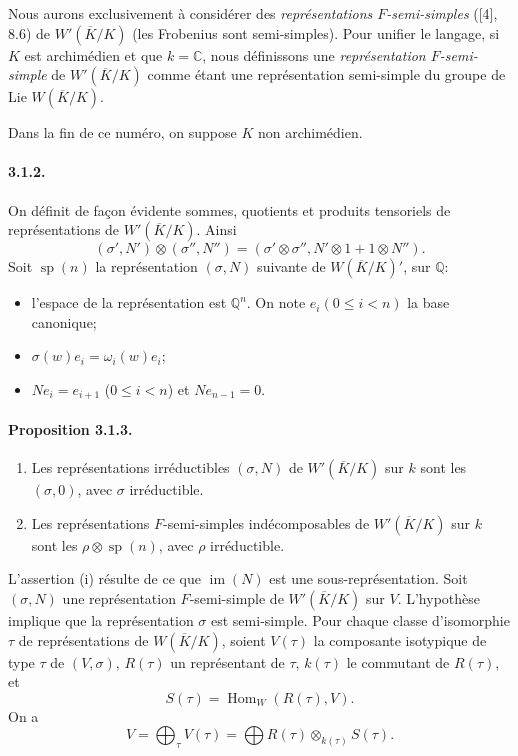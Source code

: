 \documentclass[10pt,a4paper]{article}
\providecommand{\Hom}{\operatorname{Hom}}
\providecommand{\im}{\operatorname{im}}
\providecommand{\sprep}{\operatorname{sp}}
\providecommand{\Q}{\mathbb Q}
\providecommand{\C}{\mathbb C}
\begin{document}
\clearpage
{}
\hypertarget{authority-39}{}
Nous aurons exclusivement à considérer des \emph{représentations \(F\)-semi-simples} ([4], 8.6) de \(W'(\overline K/K)\) (les Frobenius sont semi-simples). Pour unifier le langage, si \(K\) est archimédien et que \(k=\C\), nous définissons une \emph{représentation \(F\)-semi-simple} de \(W'(\overline K/K)\) comme étant une représentation semi-simple du groupe de Lie \(W(\overline K/K)\).

Dans la fin de ce numéro, on suppose \(K\) non archimédien.

\paragraph{3.1.2.} On définit de façon évidente sommes, quotients et produits tensoriels de représentations de \(W'(\overline K/K)\). Ainsi
\[
(\sigma',N')\otimes(\sigma'',N'')=(\sigma'\otimes\sigma'',N'\otimes1+1\otimes N'').
\]
Soit \(\sprep(n)\) la représentation \((\sigma,N)\) suivante de \(W(\overline K/K)'\), sur \(\Q\):
\begin{itemize}
\item l'espace de la représentation est \(\Q^n\). On note \(e_i(0\le i<n)\) la base canonique;
\item \(\sigma(w)e_i=\omega_i(w)e_i\);
\item \(Ne_i=e_{i+1}\) (\(0\le i<n\)) et \(Ne_{n-1}=0\).
\end{itemize}

\paragraph{Proposition 3.1.3.}{\itshape 
\begin{enumerate}[label=(\roman*)]
\item Les représentations irréductibles \((\sigma,N)\) de \(W'(\overline K/K)\) sur \(k\) sont les \((\sigma,0)\), avec \(\sigma\) irréductible.
\item Les représentations \(F\)-semi-simples indécomposables de \(W'(\overline K/K)\) sur \(k\) sont les \(\rho\otimes\sprep(n)\), avec \(\rho\) irréductible.
\end{enumerate}\par}

L'assertion (i) résulte de ce que \(\im(N)\) est une sous-représentation. Soit \((\sigma,N)\) une représentation \(F\)-semi-simple de \(W'(\overline K/K)\) sur \(V\). L'hypothèse implique que la représentation \(\sigma\) est semi-simple. Pour chaque classe d'isomorphie \(\tau\) de représentations de \(W(\overline K/K)\), soient \(V(\tau)\) la composante isotypique de type \(\tau\) de \((V,\sigma)\), \(R(\tau)\) un représentant de \(\tau\), \(k(\tau)\) le commutant de \(R(\tau)\), et
\[
S(\tau)=\Hom_W(R(\tau),V).
\]
On a
\[
V=\bigoplus_\tau V(\tau)=\bigoplus R(\tau)\otimes_{k(\tau)}S(\tau).
\]
\end{document}
